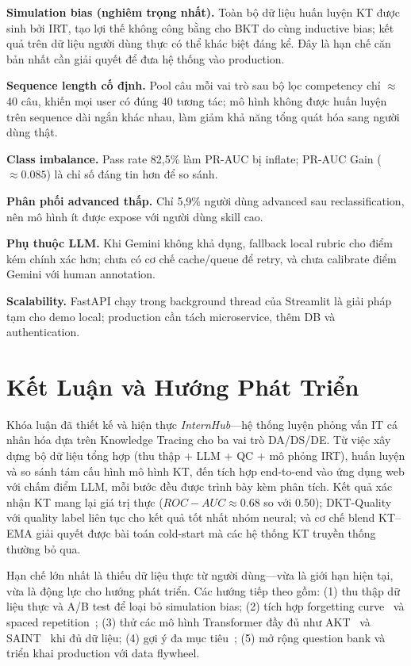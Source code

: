 \documentclass[conference]{IEEEtran}
\newcommand{\sys}{\textit{InternHub}}
\newcommand{\auc}{ROC-AUC}
\newcommand{\prauc}{PR-AUC}
\begin{document}
\textbf{Simulation bias (nghiêm trọng nhất).} Toàn bộ dữ liệu huấn luyện KT được sinh bởi IRT, tạo lợi thế không công bằng cho BKT do cùng inductive bias; kết quả trên dữ liệu người dùng thực có thể khác biệt đáng kể. Đây là hạn chế căn bản nhất cần giải quyết để đưa hệ thống vào production.

\textbf{Sequence length cố định.} Pool câu mỗi vai trò sau bộ lọc competency chỉ $\approx$40 câu, khiến mọi user có đúng 40 tương tác; mô hình không được huấn luyện trên sequence dài ngắn khác nhau, làm giảm khả năng tổng quát hóa sang người dùng thật.

\textbf{Class imbalance.} Pass rate 82,5\% làm \prauc{} bị inflate; \prauc{} Gain ($\approx 0.085$) là chỉ số đáng tin hơn để so sánh.

\textbf{Phân phối advanced thấp.} Chỉ 5,9\% người dùng advanced sau reclassification, nên mô hình ít được expose với người dùng skill cao.

\textbf{Phụ thuộc LLM.} Khi Gemini không khả dụng, fallback local rubric cho điểm kém chính xác hơn; chưa có cơ chế cache/queue để retry, và chưa calibrate điểm Gemini với human annotation.

\textbf{Scalability.} FastAPI chạy trong background thread của Streamlit là giải pháp tạm cho demo local; production cần tách microservice, thêm DB và authentication.

\section{Kết Luận và Hướng Phát Triển}
\label{sec:conclusion}

Khóa luận đã thiết kế và hiện thực \sys{}---hệ thống luyện phỏng vấn IT cá nhân hóa dựa trên Knowledge Tracing cho ba vai trò DA/DS/DE. Từ việc xây dựng bộ dữ liệu tổng hợp (thu thập + LLM + QC + mô phỏng IRT), huấn luyện và so sánh tám cấu hình mô hình KT, đến tích hợp end-to-end vào ứng dụng web với chấm điểm LLM, mỗi bước đều được trình bày kèm phân tích. Kết quả xác nhận KT mang lại giá trị thực ($\auc\approx 0.68$ so với 0.50); DKT-Quality với quality label liên tục cho kết quả tốt nhất nhóm neural; và cơ chế blend KT--EMA giải quyết được bài toán cold-start mà các hệ thống KT truyền thống thường bỏ qua.

Hạn chế lớn nhất là thiếu dữ liệu thực từ người dùng---vừa là giới hạn hiện tại, vừa là động lực cho hướng phát triển. Các hướng tiếp theo gồm: (1) thu thập dữ liệu thực và A/B test để loại bỏ simulation bias; (2) tích hợp forgetting curve~\cite{ebbinghaus1885memory} và spaced repetition~\cite{wozniak1990optimization}; (3) thử các mô hình Transformer đầy đủ như AKT~\cite{ghosh2020context} và SAINT~\cite{choi2020towards} khi đủ dữ liệu; (4) gợi ý đa mục tiêu~\cite{van1998optimal}; (5) mở rộng question bank và triển khai production với data flywheel.

\printbibliography
\end{document}
